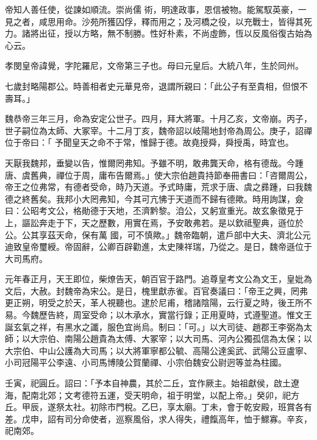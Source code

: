 \begin{pinyinscope}
 帝知人善任使，從諫如順流。崇尚儒
 術，明達政事，恩信被物。能駕馭英豪，一見之者，咸思用命。沙苑所獲囚俘，釋而用之；及河橋之役，以充戰士，皆得其死力。諸將出征，授以方略，無不制勝。性好朴素，不尚虛飾，恆以反風俗復古始為心云。



 孝閔皇帝諱覺，字陀羅尼，文帝第三子也。母曰元皇后。大統八年，生於同州。



 七歲封略陽郡公。時善相者史元華見帝，退謂所親曰：「此公子有至貴相，但恨不壽耳。」



 魏恭帝三年三月，命為安定公世子。四月，拜大將軍。十月乙亥，文帝崩。丙子，世子嗣位為太師、大冢宰。十二月丁亥，魏帝詔以岐陽地封帝為周公。庚子，詔禪位于帝曰：「
 予聞皇天之命不于常，惟歸于德。故堯授舜，舜授禹，時宜也。



 天厭我魏邦，垂變以告，惟爾罔弗知。予雖不明，敢弗龔天命，格有德哉。今踵唐、虞舊典，禪位于周，庸布告爾焉。」使大宗伯趙貴持節奉冊書曰：「咨爾周公，帝王之位弗常，有德者受命，時乃天道。予式時庸，荒求于唐、虞之彞踵，曰我魏德之終舊矣。我邦小大罔弗知，今其可亢怫于天道而不歸有德歟。時用詢謀，僉曰：公昭考文公，格勛德于天地，丕濟黔黎。洎公，又躬宣重光。故玄象徵見于上，謳訟奔走于下，天之歷數，用實在焉，予安敢弗若。是以欽祗聖典，遜位於公。公其享茲天命，保有萬
 國，可不慎歟。」魏帝臨朝，遣戶部中大夫、濟北公元迪致皇帝璽綬。帝固辭，公卿百辟勸進，太史陳祥瑞，乃從之。是日，魏帝遜位于大司馬府。



 元年春正月，天王即位，柴燎告天，朝百官于路門。追尊皇考文公為文王，皇妣為文后，大赦。封魏帝為宋公。是日，槐里獻赤雀。百官奏議曰：「帝王之興，罔弗更正朔，明受之於天，革人視聽也。逮於尼甫，稽諸陰陽，云行夏之時，後王所不易。今魏歷告終，周室受命；以木承水，實當行錄；正用夏時，式遵聖道。惟文王誕玄氣之祥，有黑水之讖，服色宜尚烏。制曰：「可。」以大司徒、趙郡王李弼為太
 師；以大宗伯、南陽公趙貴為太傅、大冢宰；以大司馬、河內公獨孤信為太保；以大宗伯、中山公護為大司馬；以大將軍寧都公毓、高陽公達奚武、武陽公豆盧寧、小司冠陽平公李遠、小司馬博陵公賀蘭禪、小宗伯魏安公尉迥等並為柱國。



 壬寅，祀圓丘。詔曰：「予本自神農，其於二丘，宜作厥主。始祖獻侯，啟土遼海，配南北郊；文考德符五運，受天明命，祖于明堂，以配上帝。」癸卯，祀方丘。甲辰，遂祭太社。初除市門稅。乙巳，享太廟。丁未，會于乾安殿，班賞各有差。戊申，詔有司分命使者，巡察風俗，求人得失，禮餼高年，恤于鰥寡。辛亥，祀南郊。




\end{pinyinscope}
